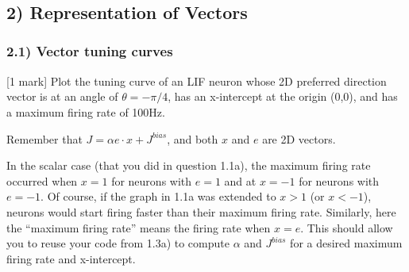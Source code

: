 \documentclass{article}
\begin{document}
    \begin{center}
    \end{center}
    { \hspace*{\fill} \\}
    
    \begin{center}
    \end{center}
    { \hspace*{\fill} \\}
    
    \begin{center}
    \end{center}
    { \hspace*{\fill} \\}
    
    \subsection{2) Representation of
Vectors}\label{representation-of-vectors}

    \subsubsection{2.1) Vector tuning curves}\label{vector-tuning-curves}

    {[}1 mark{]} Plot the tuning curve of an LIF neuron whose 2D preferred
direction vector is at an angle of $\theta=-\pi/4$, has an x-intercept
at the origin (0,0), and has a maximum firing rate of 100Hz.

Remember that $J=\alpha e \cdot x + J^{bias}$, and both $x$ and $e$ are
2D vectors.

In the scalar case (that you did in question 1.1a), the maximum firing
rate occurred when $x=1$ for neurons with $e=1$ and at $x=-1$ for
neurons with $e=-1$. Of course, if the graph in 1.1a was extended to
$x>1$ (or $x<-1$), neurons would start firing faster than their maximum
firing rate. Similarly, here the ``maximum firing rate'' means the
firing rate when $x=e$. This should allow you to reuse your code from
1.3a) to compute $\alpha$ and $J^{bias}$ for a desired maximum firing
rate and x-intercept.
\end{document}
